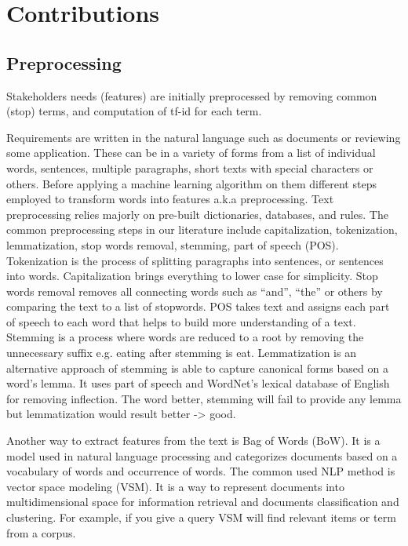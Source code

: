 \section{Contributions}
\label{sec:contributions}

\subsection{Preprocessing}
\label{sec:preprocessing}
 Stakeholders needs
(features) are initially preprocessed
by removing common (stop) terms, and computation of tf-id  for each term.

Requirements are written in the natural language such as documents or reviewing
some application. These can be in a variety of forms from a list of individual
words, sentences, multiple paragraphs, short texts with special characters or
others. Before applying a machine learning algorithm on them different steps
employed to transform words into features a.k.a preprocessing. Text preprocessing relies
majorly on pre-built dictionaries, databases, and rules. The common
preprocessing steps in our literature include capitalization, tokenization,
lemmatization, stop words removal, stemming, part of speech (POS). Tokenization
is the process of splitting paragraphs into sentences, or sentences into words.
Capitalization brings everything to lower case for simplicity. Stop words
removal removes all connecting words such as ``and'', ``the'' or others by
comparing the text to a list of stopwords. POS takes text and assigns each part of speech to each
word that helps to build more understanding of a text. Stemming is a process
where words are reduced to a root by removing the unnecessary suffix e.g. eating
after stemming is eat. Lemmatization is an alternative approach of stemming is
able to capture canonical forms based on a word's lemma. It uses part of speech
and WordNet’s lexical database of English for removing inflection. The word
better, stemming will fail to provide any lemma but lemmatization would result
better -> good.

 Another way to extract features from the text is Bag of Words (BoW). It is a
 model used in natural language processing and categorizes documents based on a
 vocabulary of words and occurrence of words. The common used NLP method is
 vector space modeling (VSM). It is a way to represent documents into
 multidimensional space for information retrieval and documents classification
 and clustering. For example, if you give a query VSM will find relevant items
 or term from a corpus.

